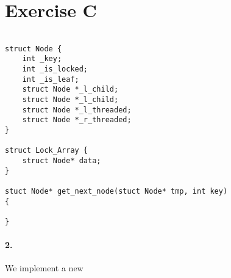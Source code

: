 \section*{Exercise C}

\begin{lstlisting}

struct Node {
	int _key;
	int _is_locked;
	int _is_leaf;
	struct Node *_l_child;
	struct Node *_l_child;
	struct Node *_l_threaded;
	struct Node *_r_threaded;
}

struct Lock_Array {
	struct Node* data;
}

stuct Node* get_next_node(stuct Node* tmp, int key)
{
	
}

\end{lstlisting}
%
%
%
%
%
%
%
%
%
%
%
%
%
%
%
%
%
%

\paragraph{2.}
We implement a new 
